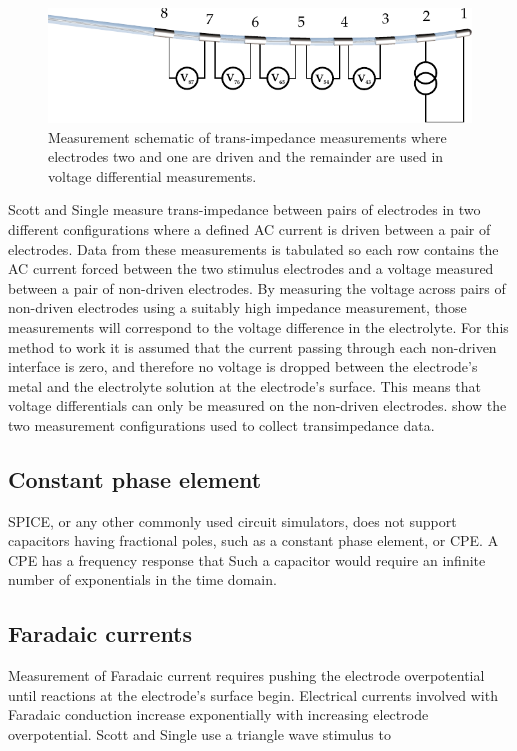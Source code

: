     \begin{figure}
      \centering
      \includegraphics{content/pt2/07-InterfaceModel/graphics/TransimpedanceMeasurements_Stim21}
      \caption{\label{fig:pt2-transimpedanceMeasurementDiagram_21Stim}Measurement schematic of trans-impedance measurements where electrodes two and one are driven and the remainder are used in voltage differential measurements.}
    \end{figure}

    Scott and Single measure trans-impedance between pairs of electrodes in two different configurations where a defined AC current is driven between a pair of electrodes.
    Data from these measurements is tabulated so each row contains the AC current forced between the two stimulus electrodes and a voltage measured between a pair of non-driven electrodes.
    By measuring the voltage across pairs of non-driven electrodes using a suitably high impedance measurement, those measurements will correspond to the voltage difference in the electrolyte.
    For this method to work it is assumed that the current passing through each non-driven interface is zero, and therefore no voltage is dropped between the electrode's metal and the electrolyte solution at the electrode's surface.
    This means that voltage differentials can only be measured on the non-driven electrodes.
     show the two measurement configurations used to collect transimpedance data.


  \subsection{Constant phase element}
    SPICE, or any other commonly used circuit simulators, does not support capacitors having fractional poles, such as a constant phase element, or CPE.
    A CPE has a frequency response that
    Such a capacitor would require an infinite number of exponentials in the time domain.


  \subsection{Faradaic currents}
    Measurement of Faradaic current requires pushing the electrode overpotential until reactions at the electrode's surface begin.
    Electrical currents involved with Faradaic conduction increase exponentially with increasing electrode overpotential.
    Scott and Single use a triangle wave stimulus to

